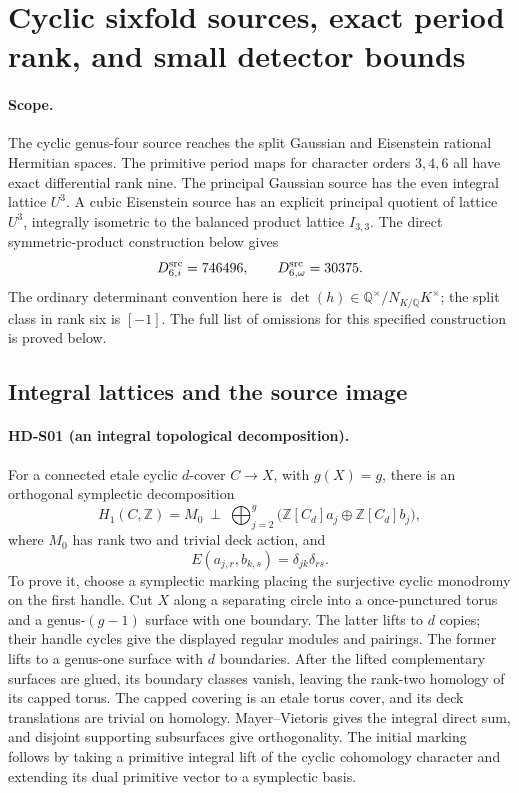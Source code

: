 \section{Cyclic sixfold sources, exact period rank, and small detector bounds}
\label{sec:HD-S}

\paragraph{Scope.}
The cyclic genus-four source reaches the split Gaussian and Eisenstein
rational Hermitian spaces. The primitive period maps for character orders
\(3,4,6\) all have exact differential rank nine. The principal Gaussian
source has the even integral lattice \(U^3\). A cubic Eisenstein source
has an explicit principal quotient of lattice \(U^3\), integrally isometric
to the balanced product lattice \(I_{3,3}\).
The direct symmetric-product construction below gives
\[
 D^{\rm src}_{6,i}=746496,\qquad D^{\rm src}_{6,\omega}=30375.
\]
The ordinary determinant convention here is
\(\det(h)\in\mathbb Q^\times/N_{K/\mathbb Q}K^\times\);
the split class in rank six is \([-1]\).
The full list of omissions for this specified construction is proved below.

\subsection{Integral lattices and the source image}

\paragraph{HD-S01 (an integral topological decomposition).}
For a connected etale cyclic \(d\)-cover \(C\to X\), with \(g(X)=g\),
there is an orthogonal symplectic decomposition
\[
 H_1(C,\mathbb Z)=M_0\ \perp\
 \bigoplus_{j=2}^{g}
  \bigl(\mathbb Z[C_d]a_j\oplus\mathbb Z[C_d]b_j\bigr),
\]
where \(M_0\) has rank two and trivial deck action, and
\[
 E(a_{j,r},b_{k,s})=\delta_{jk}\delta_{rs}.
\]
To prove it, choose a symplectic marking placing the surjective cyclic
monodromy on the first handle. Cut \(X\) along a separating circle into
a once-punctured torus and a genus-\((g-1)\) surface with one boundary.
The latter lifts to \(d\) copies; their handle cycles give the displayed
regular modules and pairings. The former lifts to a genus-one surface
with \(d\) boundaries. After the lifted complementary surfaces are glued,
its boundary classes vanish, leaving the rank-two homology of its capped
torus. The capped covering is an etale torus cover, and its deck
translations are trivial on homology. Mayer--Vietoris gives the integral
direct sum, and disjoint supporting subsurfaces give orthogonality.
The initial marking follows by taking a primitive integral lift of the
cyclic cohomology character and extending its dual primitive vector to a
symplectic basis.

